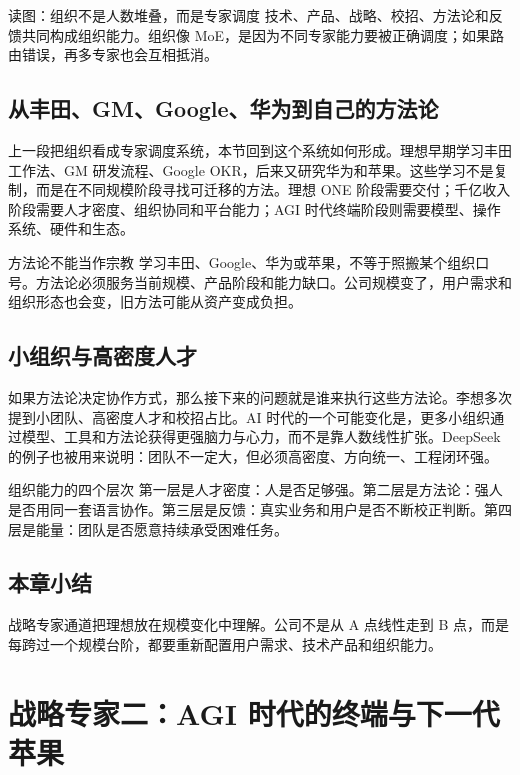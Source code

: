 \documentclass[a4paper]{article}
\begin{document}
\begin{knowledgebox}{读图：组织不是人数堆叠，而是专家调度}
技术、产品、战略、校招、方法论和反馈共同构成组织能力。组织像 MoE，是因为不同专家能力要被正确调度；如果路由错误，再多专家也会互相抵消。
\end{knowledgebox}

\subsection{从丰田、GM、Google、华为到自己的方法论}

上一段把组织看成专家调度系统，本节回到这个系统如何形成。理想早期学习丰田工作法、GM 研发流程、Google OKR，后来又研究华为和苹果。这些学习不是复制，而是在不同规模阶段寻找可迁移的方法。理想 ONE 阶段需要交付；千亿收入阶段需要人才密度、组织协同和平台能力；AGI 时代终端阶段则需要模型、操作系统、硬件和生态。

\begin{warningbox}{方法论不能当作宗教}
学习丰田、Google、华为或苹果，不等于照搬某个组织口号。方法论必须服务当前规模、产品阶段和能力缺口。公司规模变了，用户需求和组织形态也会变，旧方法可能从资产变成负担。
\end{warningbox}

\subsection{小组织与高密度人才}

如果方法论决定协作方式，那么接下来的问题就是谁来执行这些方法论。李想多次提到小团队、高密度人才和校招占比。AI 时代的一个可能变化是，更多小组织通过模型、工具和方法论获得更强脑力与心力，而不是靠人数线性扩张。DeepSeek 的例子也被用来说明：团队不一定大，但必须高密度、方向统一、工程闭环强。

\begin{importantbox}{组织能力的四个层次}
第一层是人才密度：人是否足够强。第二层是方法论：强人是否用同一套语言协作。第三层是反馈：真实业务和用户是否不断校正判断。第四层是能量：团队是否愿意持续承受困难任务。
\end{importantbox}

\subsection{本章小结}

战略专家通道把理想放在规模变化中理解。公司不是从 A 点线性走到 B 点，而是每跨过一个规模台阶，都要重新配置用户需求、技术产品和组织能力。

\section{战略专家二：AGI 时代的终端与下一代苹果}
\end{document}
